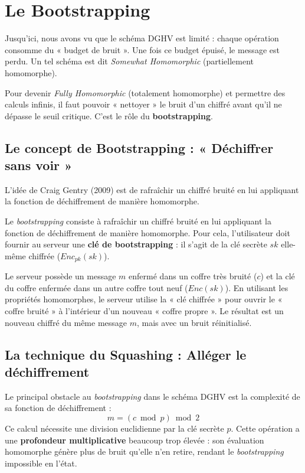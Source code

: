\section{Le Bootstrapping}

Jusqu'ici, nous avons vu que le schéma DGHV est limité : chaque opération consomme du « budget de bruit ». Une fois ce budget épuisé, le message est perdu. Un tel schéma est dit \textit{Somewhat Homomorphic} (partiellement homomorphe). 

Pour devenir \textit{Fully Homomorphic} (totalement homomorphe) et permettre des calculs infinis, il faut pouvoir « nettoyer » le bruit d'un chiffré avant qu'il ne dépasse le seuil critique. C'est le rôle du \textbf{bootstrapping}.

\subsection{Le concept de Bootstrapping : « Déchiffrer sans voir »}

L'idée de Craig Gentry (2009) est de rafraîchir un chiffré bruité en lui appliquant la fonction de déchiffrement de manière homomorphe.

\begin{definition}
Le \textit{bootstrapping} consiste à rafraîchir un chiffré bruité en lui appliquant la fonction de déchiffrement de manière homomorphe. Pour cela, l'utilisateur doit fournir au serveur une \textbf{clé de bootstrapping} : il s'agit de la clé secrète $sk$ elle-même chiffrée ($Enc_{pk}(sk)$).
\end{definition}

\begin{remark}
Le serveur possède un message $m$ enfermé dans un coffre très bruité ($c$) et la clé du coffre enfermée dans un autre coffre tout neuf ($Enc(sk)$). En utilisant les propriétés homomorphes, le serveur utilise la « clé chiffrée » pour ouvrir le « coffre bruité » à l'intérieur d'un nouveau « coffre propre ». Le résultat est un nouveau chiffré du même message $m$, mais avec un bruit réinitialisé.
\end{remark}

\subsection{La technique du Squashing : Alléger le déchiffrement}

\begin{problem}
Le principal obstacle au \textit{bootstrapping} dans le schéma DGHV est la complexité de sa fonction de déchiffrement :
\[ m = (c \bmod p) \bmod 2 \]
Ce calcul nécessite une division euclidienne par la clé secrète $p$. Cette opération a une \textbf{profondeur multiplicative} beaucoup trop élevée : son évaluation homomorphe génère plus de bruit qu'elle n'en retire, rendant le \textit{bootstrapping} impossible en l'état.
\end{problem}

